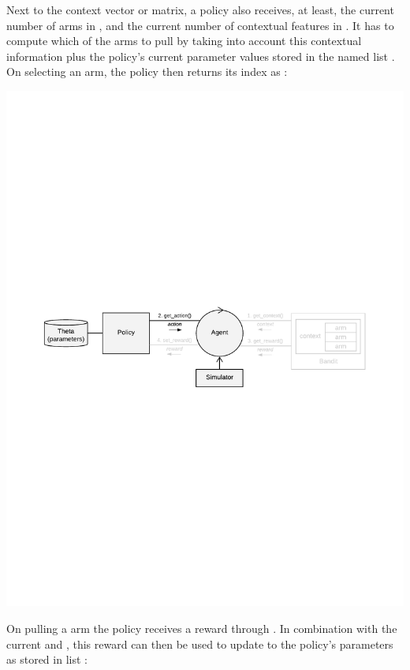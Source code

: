 \documentclass{jss}
\begin{document}
Next to the context vector or matrix, a policy also receives, at least, the current number of  arms in , and the current number of contextual features in . It has to compute which of the   arms to pull by taking into account this contextual information plus the policy's current parameter values stored in the named list . On selecting an arm, the policy then returns its index as :

\includegraphics[width=\textwidth]{fig/all_cmab_phases_Part4}

On pulling a  arm the policy receives a  reward through . In combination with the current  and , this reward can then be used to update to the policy's parameters as stored in list :
\end{document}
